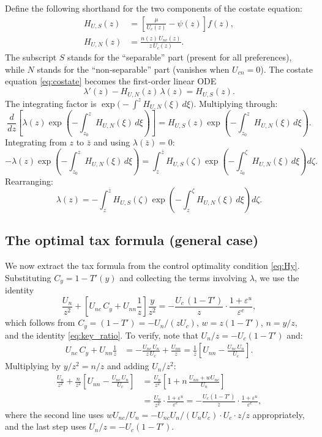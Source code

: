 \documentclass[12pt,a4paper]{article}
\theoremstyle{definition}
\theoremstyle{plain}
\theoremstyle{remark}
\newcommand{\zbar}{\bar{z}}
\newcommand{\zlow}{z_{\scriptscriptstyle 0}}
\begin{document}
Define the following shorthand for the two components of the costate equation:
\begin{align}
  H_{U,S}(z) &= \left[ \frac{\mu}{U_c(z)} - \psi(z) \right] f(z),
  \label{eq:HUS} \\[4pt]
  H_{U,N}(z) &= \frac{n(z) \, U_{nc}(z)}{z \, U_c(z)}.
  \label{eq:HUN}
\end{align}
The subscript $S$ stands for the ``separable'' part (present for all preferences), while $N$ stands for the ``non-separable'' part (vanishes when $U_{cn} = 0$). The costate equation \eqref{eq:costate} becomes the first-order linear ODE
\begin{equation}
\label{eq:lambda_ODE}
  \lambda'(z) - H_{U,N}(z) \, \lambda(z) = H_{U,S}(z).
\end{equation}
The integrating factor is $\exp\!\bigl(-\!\int^z H_{U,N}(\xi) \, d\xi\bigr)$. Multiplying through:
\[
  \frac{d}{dz}\left[ \lambda(z) \exp\!\left(-\int_{\zlow}^{z} H_{U,N}(\xi) \, d\xi\right) \right]
  = H_{U,S}(z) \exp\!\left(-\int_{\zlow}^{z} H_{U,N}(\xi) \, d\xi\right).
\]
Integrating from $z$ to $\zbar$ and using $\lambda(\zbar) = 0$:
\[
  -\lambda(z) \exp\!\left(-\int_{\zlow}^{z} H_{U,N}(\xi) \, d\xi\right)
  = \int_{z}^{\zbar} H_{U,S}(\zeta) \exp\!\left(-\int_{\zlow}^{\zeta} H_{U,N}(\xi) \, d\xi\right) d\zeta.
\]
Rearranging:
\begin{equation}
\label{eq:lambda_solution}
  \boxed{
  \lambda(z) = -\int_{z}^{\zbar} H_{U,S}(\zeta) \exp\!\left( -\int_{z}^{\zeta} H_{U,N}(\xi) \, d\xi \right) d\zeta.
  }
\end{equation}

\subsection{The optimal tax formula (general case)}

We now extract the tax formula from the control optimality condition \eqref{eq:Hy}. Substituting $C_y = 1 - T'(y)$ and collecting the terms involving $\lambda$, we use the identity
\[
  \frac{U_n}{z^2} + \left[ U_{nc} \, C_y + U_{nn} \frac{1}{z} \right] \frac{y}{z^2}
  = -\frac{U_c \,(1-T')}{z} \cdot \frac{1+\varepsilon^u}{\varepsilon^c},
\]
which follows from $C_y = (1-T') = -U_n/(zU_c)$, $w = z(1-T')$, $n = y/z$, and the identity \eqref{eq:key_ratio}. To verify, note that $U_n/z = -U_c(1-T')$ and:
\begin{align*}
  U_{nc} \, C_y + U_{nn}\frac{1}{z}
  &= -\frac{U_{nc} \, U_n}{z\, U_c} + \frac{U_{nn}}{z}
  = \frac{1}{z}\left[U_{nn} - \frac{U_{nc}\, U_n}{U_c}\right].
\end{align*}
Multiplying by $y/z^2 = n/z$ and adding $U_n/z^2$:
\begin{align*}
  \frac{U_n}{z^2} + \frac{n}{z^2}\left[U_{nn} - \frac{U_{nc}\, U_n}{U_c}\right]
  &= \frac{U_n}{z^2}\left[1 + n\,\frac{U_{nn} + wU_{nc}}{U_n}\right] \\
  &= \frac{U_n}{z^2}\cdot\frac{1+\varepsilon^u}{\varepsilon^c}
  = -\frac{U_c(1-T')}{z}\cdot\frac{1+\varepsilon^u}{\varepsilon^c},
\end{align*}
where the second line uses $wU_{nc}/U_n = -U_{nc}U_n/(U_n U_c) \cdot U_c \cdot z/z$ appropriately, and the last step uses $U_n/z = -U_c(1-T')$.
\end{document}
